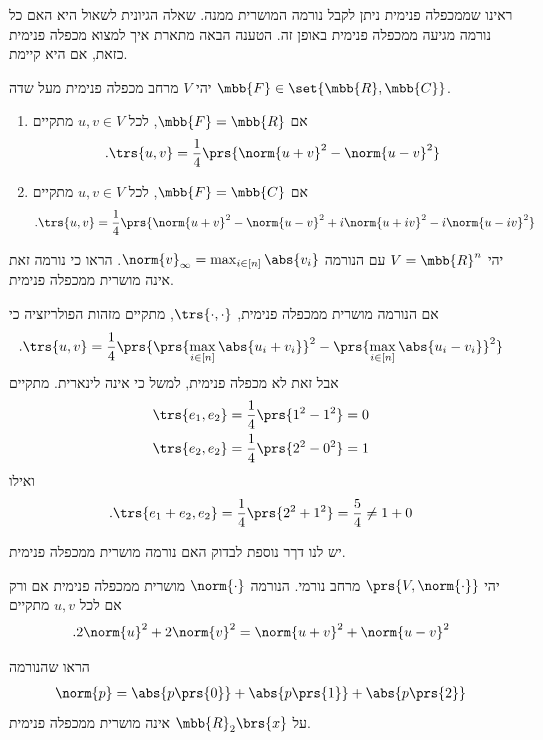 \documentclass[a4paper,10pt,twoside,openany]{book}
\begin{document}
ראינו שממכפלה פנימית ניתן לקבל נורמה המושרית ממנה. שאלה הגיונית לשאול היא האם כל נורמה מגיעה ממכפלה פנימית באופן זה. הטענה הבאה מתארת איך למצוא מכפלה פנימית כזאת, אם היא קיימת.

\begin{proposition}
יהי
$V$
מרחב מכפלה פנימית מעל שדה
$\mbb{F} \in \set{\mbb{R}, \mbb{C}}$.

\begin{enumerate}
\item אם
$\mbb{F} = \mbb{R}$,
לכל
$u,v \in V$
מתקיים
\[\text{.} \trs{u,v} = \frac{1}{4} \prs{\norm{u + v}^2 - \norm{u-v}^2}\]

\item אם
$\mbb{F} = \mbb{C}$,
לכל
$u,v \in V$
מתקיים
\[\text{.} \trs{u,v} = \frac{1}{4} \prs{\norm{u+v}^2 - \norm{u-v}^2 + i \norm{u+iv}^2 - i\norm{u-iv}^2}\]
\end{enumerate}
\end{proposition}

\begin{exercisechap}
יהי
$V = \mbb{R}^n$
עם הנורמה
$\norm{v}_{\infty} = \max_{i \in [n]} \abs{v_i}$.
הראו כי נורמה זאת אינה מושרית ממכפלה פנימית.
\end{exercisechap}

\begin{solution}
אם הנורמה מושרית ממכפלה פנימית,
$\trs{\cdot, \cdot}$,
מתקיים מזהות הפולריזציה כי
\[\text{.} \trs{u,v} = \frac{1}{4} \prs{\prs{\max_{i \in [n]} \abs{u_i + v_i}}^2 - \prs{\max_{i \in [n]} \abs{u_i - v_i}}^2}\]
אבל זאת לא מכפלה פנימית, למשל כי אינה לינארית.
מתקיים
\begin{align*}
\trs{e_1, e_2} &= \frac{1}{4} \prs{1^2 - 1^2} = 0 \\
\trs{e_2, e_2} &= \frac{1}{4} \prs{2^2 - 0^2} = 1
\end{align*}
ואילו
\[\text{.} \trs{e_1 + e_2, e_2} = \frac{1}{4} \prs{2^2 + 1^2} = \frac{5}{4} \neq 1 + 0\]
\end{solution}

יש לנו דךר נוספת לבדוק האם נורמה מושרית ממכפלה פנימית.

\begin{theorem}
יהי
$\prs{V, \norm{\cdot}}$
מרחב נורמי. הנורמה
$\norm{\cdot}$
מושרית ממכפלה פנימית אם ורק אם לכל
$u,v$
מתקיים
\[\text{.} 2 \norm{u}^2 + 2 \norm{v}^2 = \norm{u+v}^2 + \norm{u-v}^2\]
\end{theorem}

\begin{exercisechap}
הראו שהנורמה
\begin{align*}
\norm{p} = \abs{p\prs{0}} + \abs{p\prs{1}} + \abs{p\prs{2}}
\end{align*}
על
$\mbb{R}_2\brs{x}$
אינה מושרית ממכפלה פנימית.
\end{exercisechap}
\end{document}

